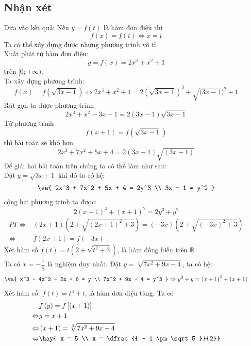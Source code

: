 \subsection*{Nhận xét}
Dựa vào kết quả: Nếu $y=f(t)$ là hàm đơn điệu thì $$f\left( x \right) = f\left( t \right) \Leftrightarrow x = t$$
Ta có thể xây dựng được những phương trình vô tỉ.\\
Xuất phát từ hàm đơn điệu:  
$$y = f\left( x \right) = 2x^3 + x^2 + 1$$
trên $[0 ;+\infty)$.\\
Ta xây dựng phương trình: 
$$f\left( x \right) = f\left( {\sqrt {3x - 1} } \right) \Leftrightarrow 2x^3 + x^2 + 1 = 2\left( {\sqrt {3x - 1} } \right)^3 + \sqrt {(3x - 1} )^2 + 1$$
 Rút gọn ta được phương trình 
$$2x^3 + x^2 - 3x + 1 = 2\left( {3x - 1} \right)\sqrt {3x - 1} $$
Từ phương trình $$f\left( {x + 1} \right) = f\left( {\sqrt {3x - 1} } \right)$$ 
thì bài toán sẽ khó hơn 
$$2x^3 + 7x^2 + 5x + 4 = 2\left( {3x - 1} \right)\sqrt {\left( {3x - 1} \right)} $$
Để giải hai bài toán trên chúng ta có thể làm như sau: \\
Đặt $y=\sqrt{3x+1}$ khi đó ta có hệ: $$\va{
 2x^3 + 7x^2 + 5x + 4 = 2y^3 \\ 
 3x - 1 = y^2 }$$ cộng hai phương trình ta được:
$$2\left( {x + 1} \right)^3 + \left( {x + 1} \right)^2 =2y^3 + y^2 $$
\hda
\begin{align*}
PT \Leftrightarrow & \left( {2x + 1} \right)\left( {2 + \sqrt {\left( {2x + 1} \right)^2 + 3} } \right) = \left( { - 3x} \right)\left( {2 + \sqrt {\left( { - 3x} \right)^2 + 3} } \right) \\
 \Leftrightarrow & f\left( {2x + 1} \right) = f\left( { - 3x} \right)
\end{align*}
Xét hàm số $f\left( t \right) = t\left( {2 + \sqrt {t^2 + 3} } \right)$, là hàm đồng biến trên $\mathbb{R}$.\\
Ta có $x = - \dfrac{1}{5}$ là nghiệm duy nhất.
\hda Đặt $y = \sqrt[3]{{7x^2 + 9x - 4}}$, ta có hệ:  $$\va{
 x^3 - 4x^2 - 5x + 6 = y \\ 
 7x^2 + 9x - 4 = y^3 } \Rightarrow y^3 + y = \left( {x + 1} \right)^3 + \left( {x + 1} \right)$$
Xét hàm số: $f(t)=t^3+t$, là hàm đơn điệu tăng. Ta có
\begin{align*}
& f\left( y \right) = f\left[ {\left( {x + 1} \right)} \right]\\
 \Leftrightarrow & y = x + 1 \\ \Leftrightarrow & \left( {x + 1} \right) = \sqrt[3]{{7x^2 + 9x - 4}} \\
  \Leftrightarrow &\hay{
 x = 5 \\ 
 x = \dfrac{{ - 1 \pm \sqrt 5 }}{2}}
\end{align*}